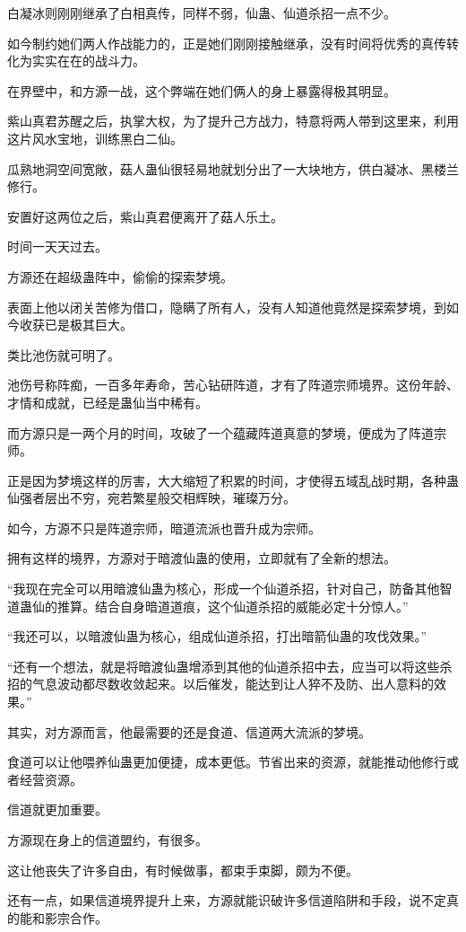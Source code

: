 \begin{this_body}
白凝冰则刚刚继承了白相真传，同样不弱，仙蛊、仙道杀招一点不少。

如今制约她们两人作战能力的，正是她们刚刚接触继承，没有时间将优秀的真传转化为实实在在的战斗力。

在界壁中，和方源一战，这个弊端在她们俩人的身上暴露得极其明显。

紫山真君苏醒之后，执掌大权，为了提升己方战力，特意将两人带到这里来，利用这片风水宝地，训练黑白二仙。

瓜熟地洞空间宽敞，菇人蛊仙很轻易地就划分出了一大块地方，供白凝冰、黑楼兰修行。

安置好这两位之后，紫山真君便离开了菇人乐土。

时间一天天过去。

方源还在超级蛊阵中，偷偷的探索梦境。

表面上他以闭关苦修为借口，隐瞒了所有人，没有人知道他竟然是探索梦境，到如今收获已是极其巨大。

类比池伤就可明了。

池伤号称阵痴，一百多年寿命，苦心钻研阵道，才有了阵道宗师境界。这份年龄、才情和成就，已经是蛊仙当中稀有。

而方源只是一两个月的时间，攻破了一个蕴藏阵道真意的梦境，便成为了阵道宗师。

正是因为梦境这样的厉害，大大缩短了积累的时间，才使得五域乱战时期，各种蛊仙强者层出不穷，宛若繁星般交相辉映，璀璨万分。

如今，方源不只是阵道宗师，暗道流派也晋升成为宗师。

拥有这样的境界，方源对于暗渡仙蛊的使用，立即就有了全新的想法。

“我现在完全可以用暗渡仙蛊为核心，形成一个仙道杀招，针对自己，防备其他智道蛊仙的推算。结合自身暗道道痕，这个仙道杀招的威能必定十分惊人。”

“我还可以，以暗渡仙蛊为核心，组成仙道杀招，打出暗箭仙蛊的攻伐效果。”

“还有一个想法，就是将暗渡仙蛊增添到其他的仙道杀招中去，应当可以将这些杀招的气息波动都尽数收敛起来。以后催发，能达到让人猝不及防、出人意料的效果。”

其实，对方源而言，他最需要的还是食道、信道两大流派的梦境。

食道可以让他喂养仙蛊更加便捷，成本更低。节省出来的资源，就能推动他修行或者经营资源。

信道就更加重要。

方源现在身上的信道盟约，有很多。

这让他丧失了许多自由，有时候做事，都束手束脚，颇为不便。

还有一点，如果信道境界提升上来，方源就能识破许多信道陷阱和手段，说不定真的能和影宗合作。


\end{this_body}
